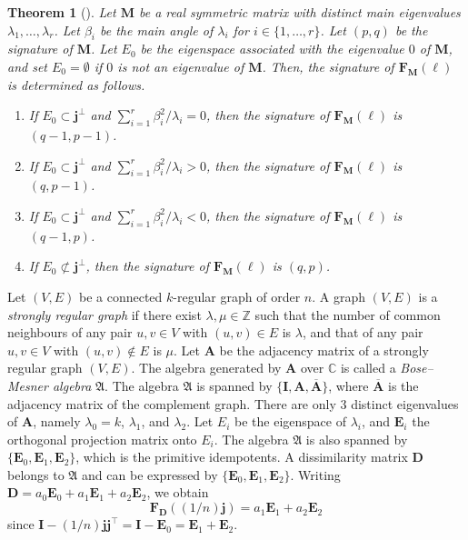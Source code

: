 \documentclass[a4paper, 11pt]{article}
\newcommand{\A}{\boldsymbol{A}}
\newcommand{\E}{\boldsymbol{E}}
\newcommand{\I}{\boldsymbol{I}}
\newcommand{\D}{\boldsymbol{D}}
\newcommand{\F}{\boldsymbol{F}}
\newcommand{\M}{\boldsymbol{M}}
\newcommand{\jv}{\boldsymbol{j}}
\newcommand{\el}{\boldsymbol{\ell}}
\newtheorem{theorem}{Theorem}[section]
\theoremstyle{definition}
\begin{document}
\begin{theorem}[{\cite{NSSpre}}] \label{thm:dim_PMP}
Let $\M$ be a real symmetric matrix with distinct main eigenvalues
$\lambda_1, \ldots,\lambda_r$.
Let $\beta_i$ be the main angle of $\lambda_i$ for $i \in \{1,\ldots, r\}$. 
Let $(p,q)$ be the signature of $\M$.
Let $E_0$ be the eigenspace associated with the eigenvalue $0$ of $\M$, and set $E_0 = \emptyset$ if $0$ is not an eigenvalue of $\M$.   Then, the signature of $\F_{\M}(\el)$ is determined as follows. 
\begin{enumerate}
\item If $E_0 \subset \jv^\perp$ and $\sum_{i=1}^r \beta_i^2/\lambda_i=0$, 
then the signature of $\F_{\M}(\el)$ is $(q-1,p-1)$. 
\item If $E_0 \subset \jv^\perp$ and $\sum_{i=1}^r \beta_i^2/\lambda_i>0$, 
then the signature of $\F_{\M}(\el)$ is $(q,p-1)$. 
\item If $E_0 \subset \jv^\perp$ and $\sum_{i=1}^r \beta_i^2/\lambda_i<0$, 
then the signature of $\F_{\M}(\el)$ is $(q-1,p)$. 
\item If $E_0 \not\subset \jv^\perp$, then the signature of $\F_{\M}(\el)$ is $(q,p)$.
\end{enumerate}

\end{theorem} 

Let $(V,E)$ be a connected $k$-regular graph of order $n$. 
A graph $(V,E)$ is a {\it strongly regular graph}
if there exist $\lambda, \mu \in \mathbb{Z}$ 
such that 
the number of common neighbours of any pair $u, v \in V$ with $(u,v) \in E$ is $\lambda$, 
and that of any pair $u, v \in V$ with $(u,v) \not \in E$ is $\mu$. 
Let $\A$ be the adjacency matrix of a strongly regular graph $(V,E)$. 
The algebra generated by $\A$ over $\mathbb{C}$ is called a {\it Bose--Mesner algebra} $\mathfrak{A}$. The algebra $\mathfrak{A}$ is spanned by $\{\I, \A, \overline{\A}\}$, where $\overline{\A}$ is the adjacency matrix of the complement graph. 
There are only 3 distinct eigenvalues of $\A$, namely $\lambda_0=k$, $\lambda_1$, and $\lambda_2$. 
Let $E_i$ be the eigenspace of $\lambda_i$, and $\E_i$ the orthogonal projection matrix onto $E_i$. 
The algebra $\mathfrak{A}$ is also spanned by $\{\E_0,\E_1,\E_2\}$, which is the primitive idempotents. 
A dissimilarity matrix $\D$ belongs to $\mathfrak{A}$ and can be expressed by $\{\E_0,\E_1,\E_2\}$. 
 Writing $\D=a_0\E_0+a_1\E_1+a_2\E_2$, we obtain
\begin{equation} \label{eq:srg_rep}
    \F_{\D} ((1/n) \jv)= a_1 \E_1 +a_2 \E_2
\end{equation}
since $\I-(1/n)\jv \jv^\top=\I-\E_0=\E_1+\E_2$. 
\end{document}
